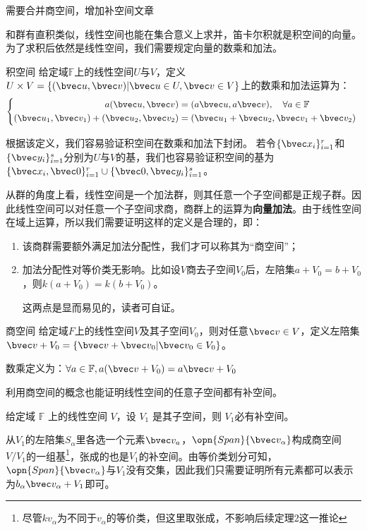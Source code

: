 

\begin{issues}
\issueTODO 需要合并商空间，增加补空间文章
\end{issues}


和群有直积类似，线性空间也能在集合意义上求并，笛卡尔积就是积空间的向量。为了求积后依然是线性空间，我们需要规定向量的数乘和加法。

\begin{definition}{积空间}
给定域$\mathbb F $上的线性空间$U$与$V$，定义$U\times V=\{(\bvec u,\bvec v)|\bvec u\in U,\bvec v\in V\}$上的数乘和加法运算为：
\begin{equation}
\left\{\begin{aligned}
a(\bvec u,\bvec v)&=(a\bvec u,a\bvec v),\quad \forall a\in \mathbb F\\
(\bvec u_1,\bvec v_1)+(\bvec u_2,\bvec v_2)&=(\bvec u_1+\bvec u_2,\bvec v_1+\bvec v_2)
\end{aligned}\right.~
\end{equation}
\end{definition}
根据该定义，我们容易验证积空间在数乘和加法下封闭。
若令$\{\bvec x_i\}^r_{i=1}$和$\{\bvec y_i\}^s_{i=1}$分别为$U$与$V$的基，我们也容易验证积空间的基为$\{\bvec x_i,\bvec 0\}^r_{i=1}\cup \{\bvec 0,\bvec y_i\}^s_{i=1}$。

从群的角度上看，线性空间是一个加法群，则其任意一个子空间都是正规子群。因此线性空间可以对任意一个子空间求商，商群上的运算为\textbf{向量加法}。由于线性空间在域上运算，所以我们需要证明这样的定义是合理的，即：
\begin{enumerate}
\item 该商群需要额外满足加法分配性，我们才可以称其为“商空间”；
\item 加法分配性对等价类无影响。比如设$V$商去子空间$V_0$后，左陪集$a+V_0=b+V_0$，则$k(a+V_0)=k(b+V_0)$。

这两点是显而易见的，读者可自证。
\end{enumerate}
\begin{definition}{商空间}
给定域$F$上的线性空间$V$及其子空间$V_0$，则对任意$\bvec v\in V$，定义左陪集$\bvec v+V_0=\{\bvec v+\bvec v_0|\bvec v_0\in V_0\}$。

数乘定义为：$\forall a\in \mathbb F,a(\bvec v+V_0)=a\bvec v+V_0$
\end{definition}


利用商空间的概念也能证明线性空间的任意子空间都有补空间。
\begin{theorem}{}\label{the_lnal06_1}
给定域 $\mathbb F$ 上的线性空间 $V$，设 $V_1$ 是其子空间，则 $V_1$必有补空间。
\end{theorem}
从$V_1$的左陪集${S_{\alpha}}$里各选一个元素$\bvec v_a$，$\opn{Span} \{\bvec v_{\alpha}\}$构成商空间$V/V_1$的一组基\footnote{尽管$kv_\alpha$为不同于$v_\alpha$的等价类，但这里取张成，不影响后续定理2这一推论}，张成的也是$V_1$的补空间。由等价类划分可知，$\opn{Span} \{\bvec v_{\alpha}\}$与$V_1$没有交集，因此我们只需要证明所有元素都可以表示为$b_{\alpha}\bvec v_{\alpha}+V_1$即可。

